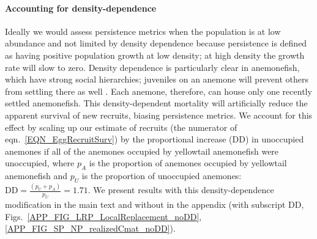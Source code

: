 \documentclass[12pt, oneside]{article}   	%
\begin{document}

\paragraph*{Accounting for density-dependence}  %

Ideally we would assess persistence metrics when the population is at low abundance and not limited by density dependence because persistence is defined as having positive population growth at low density; at high density the growth rate will slow to zero. Density dependence is particularly clear in anemonefish, which have strong social hierarchies; juveniles on an anemone will prevent others from settling there as well \citep[seen in \textit{A. percula,}][]{buston2003forcible}. Each anemone, therefore, can house only one recently settled anemonefish. This density-dependent mortality will artificially reduce the apparent survival of new recruits, biasing persistence metrics. We account for this effect by scaling up our estimate of recruits (the numerator of eqn.\ \ref{EQN_EggRecruitSurv}) by the proportional increase ($\text{DD}$) in unoccupied anemones if all of the anemones occupied by yellowtail anemonefish were unoccupied, where $p_A$ is the proportion of anemones occupied by yellowtail anemonefish and $p_U$ is the proportion of unoccupied anemones: $\text{DD} = \frac{(p_U + p_A)}{p_U} = 1.71$. We present results with this density-dependence modification in the main text and without in the appendix (with subscript DD, Figs.\ \ref{APP_FIG_LRP_LocalReplacement_noDD}, \ref{APP_FIG_SP_NP_realizedCmat_noDD}).
\end{document}
